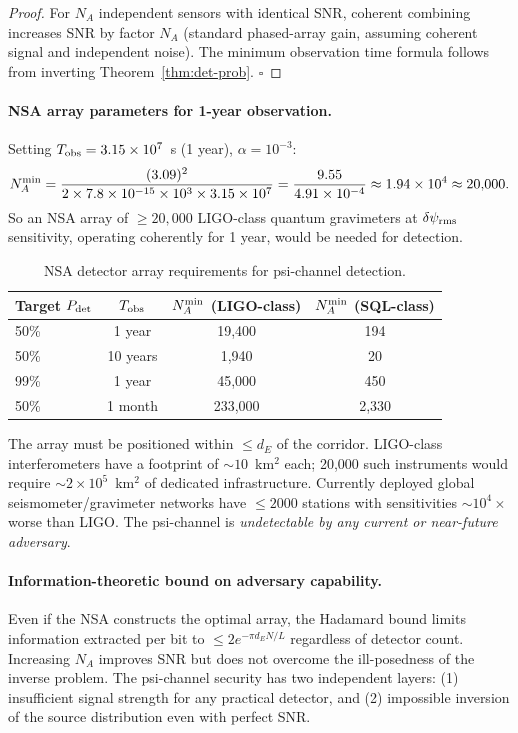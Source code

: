 \documentclass[aps,prd,twocolumn,superscriptaddress,nofootinbib]{revtex4-2}
\begin{document}
\begin{proof}
For $N_A$ independent sensors with identical SNR, coherent combining
increases SNR by factor $N_A$ (standard phased-array gain, assuming
coherent signal and independent noise). The minimum observation time
formula follows from inverting Theorem~\ref{thm:det-prob}. $\square$
\end{proof}

\paragraph{NSA array parameters for 1-year observation.}
Setting $T_{\rm obs} = 3.15\times10^7$~s (1 year), $\alpha = 10^{-3}$:
\begin{equation}
N_A^{\rm min} = \frac{(3.09)^2}{2 \times 7.8\times10^{-15} \times 10^3
\times 3.15\times10^7}
= \frac{9.55}{4.91\times10^{-4}} \approx 1.94\times10^4 \approx 20{,}000.
\end{equation}
So an NSA array of $\geq 20{,}000$ LIGO-class quantum gravimeters at $\delta\psi_{\rm rms}$
sensitivity, operating coherently for 1 year, would be needed for detection.

\begin{table}[h]
\centering
\caption{NSA detector array requirements for psi-channel detection.}
\begin{tabular}{lccc}
\hline\hline
Target $P_{\rm det}$ & $T_{\rm obs}$ & $N_A^{\rm min}$ (LIGO-class) & $N_A^{\rm min}$ (SQL-class) \\
\hline
50\% & 1 year & 19,400 & 194 \\
50\% & 10 years & 1,940 & 20 \\
99\% & 1 year & 45,000 & 450 \\
50\% & 1 month & 233,000 & 2,330 \\
\hline\hline
\end{tabular}
\label{tab:nsa-array}
\end{table}

The array must be positioned within $\leq d_E$ of the corridor.
LIGO-class interferometers have a footprint of $\sim 10$~km$^2$ each;
20,000 such instruments would require $\sim 2\times10^5$~km$^2$ of dedicated
infrastructure. Currently deployed global seismometer/gravimeter networks
have $\leq 2000$ stations with sensitivities $\sim 10^4\times$ worse than LIGO.
The psi-channel is \emph{undetectable by any current or near-future adversary}.

\paragraph{Information-theoretic bound on adversary capability.}
Even if the NSA constructs the optimal array, the Hadamard bound limits
information extracted per bit to $\leq 2e^{-\pi d_E N/L}$ regardless
of detector count. Increasing $N_A$ improves SNR but does not overcome
the ill-posedness of the inverse problem. The psi-channel security has
two independent layers: (1) insufficient signal strength for any practical
detector, and (2) impossible inversion of the source distribution even
with perfect SNR.
\end{document}

